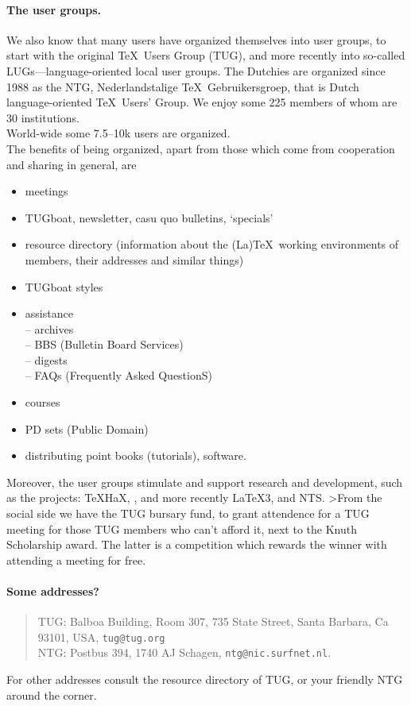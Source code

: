 \paragraph*{The user groups.}We also know that many users have
organized themselves into user groups,
to start with the original \TeX\ Users Group (TUG),
and more recently into so-called LUGs---language-oriented
local user groups.
The Dutchies are organized since 1988 as the NTG,
Nederlandstalige \TeX\ Gebruikersgroep, that is Dutch language-oriented
\TeX\ Users' Group. We enjoy some 225 members of whom are 30 institutions.
\\
World-wide some  7.5--10k users are organized.
\\
The benefits of being organized, apart from those which come
from cooperation and sharing in general, are
\begin{itemize}
\item meetings
\item TUGboat, newsletter, casu quo bulletins, `specials'
\item resource directory (information about the (La)\TeX\ working environments
      of members, their addresses and similar things)
\item TUGboat styles
\item assistance\\
      -- archives\\
      -- BBS  (Bulletin Board Services)   \\
      -- digests \\
      -- FAQs (Frequently Asked QuestionS)
\item courses
\item PD sets (Public Domain)
\item distributing point books (tutorials), software.
\end{itemize}
\noindent
Moreover, the user groups stimulate and support research and development,
such as  the projects: \TeX HaX, \BibTeX,
and more recently \LaTeX3, and NTS.
>From the social side we have the TUG  bursary fund,
to grant attendence for a TUG meeting for those TUG members who can't
afford it, next to the Knuth Scholarship award. The latter is a competition
which rewards the winner with attending a meeting for free.

\paragraph*{Some addresses?}
\begin{quote}
TUG: Balboa Building, Room 307, 735 State Street, Santa Barbara, Ca 93101, USA,
     {\tt tug@tug.org}\\[1ex]
NTG: Postbus 394, 1740 AJ Schagen,  {\tt ntg@nic.surfnet.nl}.
\end{quote}
For other addresses consult the resource directory of TUG, or
your friendly NTG around the corner.

